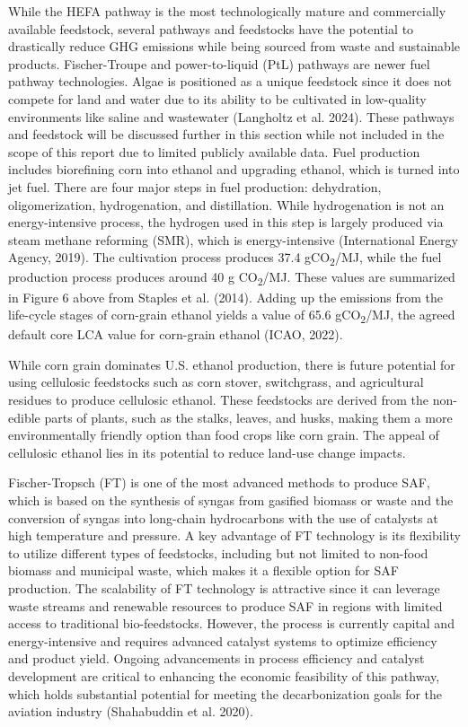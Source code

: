 \documentclass[12pt]{article}
\begin{document}
While the HEFA pathway is the most technologically mature and commercially available feedstock, several pathways and feedstocks have the potential to drastically reduce GHG emissions while being sourced from waste and sustainable products. Fischer-Troupe and power-to-liquid (PtL) pathways are newer fuel pathway technologies. Algae is positioned as a unique feedstock since it does not compete for land and water due to its ability to be cultivated in low-quality environments like saline and wastewater (Langholtz et al. 2024). These pathways and feedstock will be discussed further in this section while not included in the scope of this report due to limited publicly available data. Fuel production includes biorefining corn into ethanol and upgrading ethanol, which is turned into jet fuel. There are four major steps in fuel production: dehydration, oligomerization, hydrogenation, and distillation. While hydrogenation is not an energy-intensive process, the hydrogen used in this step is largely produced via steam methane reforming (SMR), which is energy-intensive (International Energy Agency, 2019).  The cultivation process produces 37.4 gCO\textsubscript{2}/MJ, while the fuel production process produces around 40 g CO\textsubscript{2}/MJ. These values are summarized in Figure 6 above from Staples et al. (2014). Adding up the emissions from the life-cycle stages of corn-grain ethanol yields a value of 65.6 gCO\textsubscript{2}/MJ, the agreed default core LCA value for corn-grain ethanol (ICAO, 2022).

While corn grain dominates U.S. ethanol production, there is future potential for using cellulosic feedstocks such as corn stover, switchgrass, and agricultural residues to produce cellulosic ethanol. These feedstocks are derived from the non-edible parts of plants, such as the stalks, leaves, and husks, making them a more environmentally friendly option than food crops like corn grain. The appeal of cellulosic ethanol lies in its potential to reduce land-use change impacts.

Fischer-Tropsch (FT) is one of the most advanced methods to produce SAF, which is based on the synthesis of syngas from gasified biomass or waste and the conversion of syngas into long-chain hydrocarbons with the use of catalysts at high temperature and pressure. A key advantage of FT technology is its flexibility to utilize different types of feedstocks, including but not limited to non-food biomass and municipal waste, which makes it a flexible option for SAF production. The scalability of FT technology is attractive since it can leverage waste streams and renewable resources to produce SAF in regions with limited access to traditional bio-feedstocks. However, the process is currently capital and energy-intensive and requires advanced catalyst systems to optimize efficiency and product yield. Ongoing advancements in process efficiency and catalyst development are critical to enhancing the economic feasibility of this pathway, which holds substantial potential for meeting the decarbonization goals for the aviation industry (Shahabuddin et al. 2020).
\end{document}

